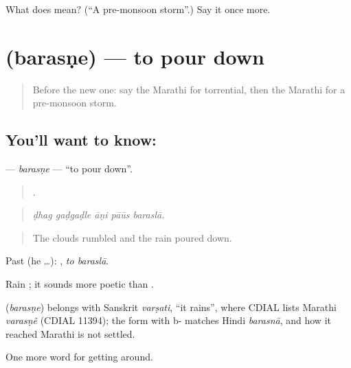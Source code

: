 \begin{tcolorbox}[breakable,colback=teal!4,colframe=teal!35!black,title={Before you move on}]
What does  mean? (\textquotedblleft{}A pre-monsoon storm\textquotedblright{}.) Say it once more.
\end{tcolorbox}
\section[\texorpdfstring{\mr{बरसणे} (barasṇe)}{बरसणे (barasṇe)}]{ (barasṇe) — to pour down}

\label{lesson:MR-C438-barasne}



\begin{quote}
Before the new one: say the Marathi for torrential, then the Marathi for a pre-monsoon storm.
\end{quote}

\subsection*{You'll want to know: }
\textbf{} — \emph{barasṇe} — \textquotedblleft{}to pour down\textquotedblright{}.

\begin{quote}
    .
\end{quote}

\begin{quote}
\emph{ḍhag gaḍgaḍle āṇi pāūs baraslā.}
\end{quote}

\begin{quote}
The clouds rumbled and the rain poured down.
\end{quote}

Past (he …):  , \emph{to baraslā}.

Rain ; it sounds more poetic than .

\begin{cousinweb}
\textbf{} (\emph{barasṇe}) belongs with Sanskrit \emph{varṣati}, \textquotedblleft{}it rains\textquotedblright{}, where CDIAL lists Marathi \emph{varasṇẽ} (CDIAL 11394); the form with b- matches Hindi \emph{barasnā}, and how it reached Marathi is not settled.
\end{cousinweb}

\begin{grammarlens}[title={What you've built}]
One more word for getting around.
\end{grammarlens}

